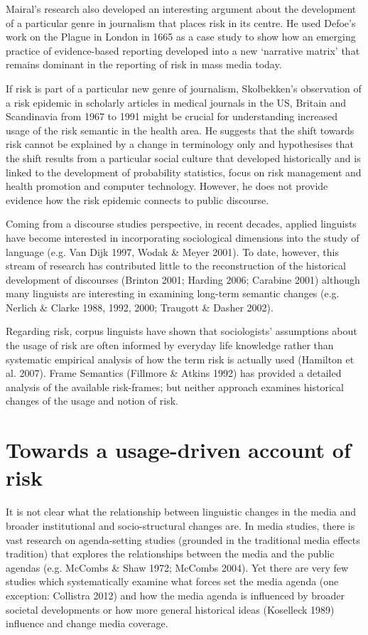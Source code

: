 Mairal's research also developed an interesting argument about the development of a particular genre in journalism that places risk in its centre. He used Defoe's work on the Plague in London in 1665 as a case study to show how an emerging practice of evidence-based reporting developed into a new `narrative matrix' that remains dominant in the reporting of risk in mass media today.

If risk is part of a particular new genre of journalism, Skolbekken's observation of a risk epidemic in scholarly articles in medical journals in the US, Britain and Scandinavia from 1967 to 1991 might be crucial for understanding increased usage of the risk semantic in the health area. He suggests that the shift towards risk cannot be explained by a change in terminology only and hypothesises that the shift results from a particular social culture that developed historically and is linked to the development of probability statistics, focus on risk management and health promotion and computer technology. However, he does not provide evidence how the risk epidemic connects to public discourse. 

Coming from a discourse studies perspective, in recent decades, applied linguists have become interested in incorporating sociological dimensions into the study of language (e.g. Van Dijk 1997, Wodak \& Meyer 2001). To date, however, this stream of research has contributed little to the reconstruction of the historical development of discourses (Brinton 2001; Harding 2006; Carabine 2001) although many linguists are interesting in examining long-term semantic changes (e.g. Nerlich \& Clarke 1988, 1992, 2000; Traugott \& Dasher 2002). 

Regarding risk, corpus linguists have shown that sociologists' assumptions about the usage of risk are often informed by everyday life knowledge rather than systematic empirical analysis of how the term risk is actually used (Hamilton et al. 2007). Frame Semantics (Fillmore \& Atkins 1992) has provided a detailed analysis of the available risk-frames; but neither approach examines historical changes of the usage and notion of risk.

\section{Towards a usage-driven account of risk}

It is not clear what the relationship between linguistic changes in the media and broader institutional and socio-structural changes are. In media studies, there is vast research on agenda-setting studies (grounded in the traditional media effects tradition) that explores the relationships between the media and the public agendas (e.g. McCombs \& Shaw 1972; McCombs 2004). Yet there are very few studies which systematically examine what forces set the media agenda (one exception: Collistra 2012) and how the media agenda is influenced by broader societal developments or how more general historical ideas (Koselleck 1989) influence and change media coverage. 

